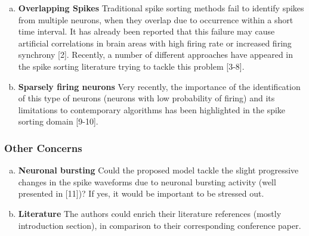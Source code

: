 
\begin{enumerate}[a.]
	\item \textbf{Overlapping Spikes} Traditional spike sorting methods fail to identify spikes from multiple neurons, when they overlap due to occurrence within a short time interval. It has already been reported that this failure may cause artificial correlations in brain areas with high firing rate or increased firing synchrony [2].  Recently, a number of different approaches have appeared in the spike sorting literature trying to tackle this problem [3-8].
	
	
	\item \textbf{Sparsely firing neurons} Very recently, the importance of the identification of this type of neurons (neurons with low probability of firing) and its limitations to contemporary algorithms has been highlighted in the spike sorting domain [9-10].
	
	

\end{enumerate}

\subsubsection{Other Concerns} %
\label{ssub:other_concerns}


\begin{enumerate}[a.]
	\item \textbf{Neuronal bursting} Could the proposed model tackle the slight progressive changes in the spike waveforms due to neuronal bursting activity (well presented in [11])? If yes, it would be important to be stressed out.
	
	
	\item \textbf{Literature} The authors could enrich their literature references (mostly introduction section), in comparison to their corresponding conference paper.
	
	
\end{enumerate}

